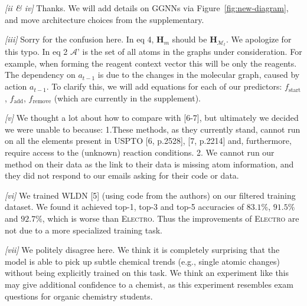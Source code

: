\documentclass{article}
\newcommand{\ourModel}{\textsc{Electro}\xspace}
\begin{document}
\emph{[ii \& iv]}
Thanks. We will add details on GGNNs via Figure~\ref{fig:new-diagram}, and move architecture choices from the supplementary.

\emph{[iii]} 
Sorry for the confusion here. In eq 4, $\mathbf{H}_m$ should be $\mathbf{H}_{\mathcal{M}_t}$. We apologize for this typo.
In eq 2 $\mathcal{A}’$ is the set of all atoms in the graphs under consideration. For example, when forming the reagent context vector this will be only the reagents.
The dependency on $a_{t-1}$ is due to the changes in the molecular graph, caused by action $a_{t-1}$. 
To clarify this, we will add equations for each of our predictors: $f_\textrm{start}$, $f_\textrm{add}$, $f_\textrm{remove}$ (which are currently in the supplement).

\emph{[v]} 
We thought a lot about how to compare with [6-7], but
 ultimately we decided we were unable to because:
  1.These methods, as they currently stand, cannot run on all the elements present in USPTO [6, p.2528], [7, p.2214] and, furthermore, require access to the (unknown) reaction conditions. 
 2. We cannot run our method on their data as the link to their data is missing atom information, and they did not respond to our emails asking for their code or data. 

\emph{[vi]} We trained WLDN [5] (using code from the authors) on our filtered training dataset.
 We found it achieved top-1, top-3 and top-5 accuracies of $83.1\%$, $91.5\%$ and $92.7\%$, which is worse than \ourModel. 
 Thus the improvements of \ourModel are not due to a more specialized training task.
  
\emph{[vii]}
 We politely disagree here.
  We think it is completely surprising that the model is able to pick up subtle chemical trends (e.g., single atomic changes) without being explicitly trained on this task.
   We think an experiment like this may give additional confidence to a chemist, %
   as this experiment resembles exam questions for organic chemistry students. %
 
\end{document}
